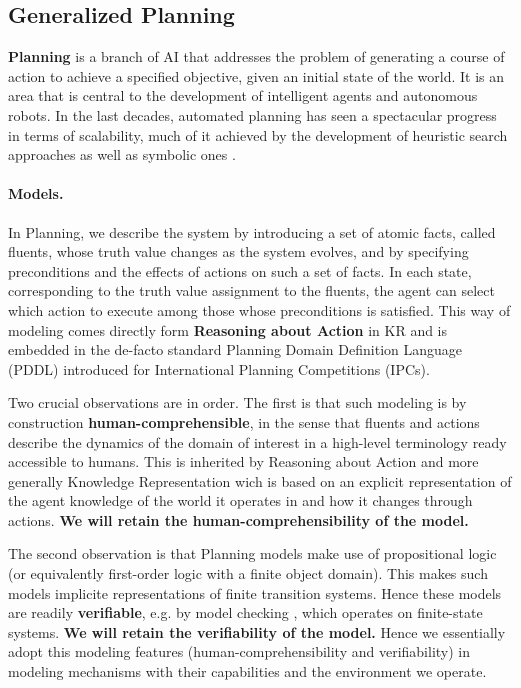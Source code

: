 \subsection{Generalized Planning} \label{subsec:GP}



\textbf{Planning} is a branch of AI that addresses the problem of generating a
course of action to achieve a specified objective, given an initial
state of the world. It is an area that is central to the development
of intelligent agents and autonomous robots. In the last decades,
automated planning has seen a spectacular progress in terms of
scalability, much of it achieved by the development of heuristic
search approaches as well as symbolic ones  \cite{GeffnerBo13,GNT2016}.

\paragraph{Models.} In Planning, we describe the system by introducing a set of
atomic facts, called fluents, whose truth value changes as the system
evolves, and by specifying preconditions and the effects of actions on
such a set of facts. In each state, corresponding to the truth value
assignment to the fluents, the agent can select which action to
execute among those whose preconditions is satisfied. This way of
modeling comes directly form \textbf{Reasoning about Action} in KR
\cite{Reiter01} and is embedded in the de-facto standard Planning
Domain Definition Language (PDDL) \cite{mcdermott:pddl,gerevini:pddl}
introduced for International Planning Competitions (IPCs).

Two crucial observations are in order. The first is that such modeling
is by construction \textbf{human-comprehensible}, in the sense that
fluents and actions describe the dynamics of the domain of interest in
a high-level terminology ready accessible to humans. This is inherited
by Reasoning about Action and more generally Knowledge Representation
wich is based on an explicit representation of the agent knowledge of
the world it operates in and how it changes through
actions. \textbf{We will retain the human-comprehensibility of the model.}

The second observation is that Planning models make use of
propositional logic (or equivalently first-order logic with a finite
object domain). This makes such models implicite representations of
finite transition systems. Hence these models are readily
\textbf{verifiable}, e.g. by model checking
\cite{ClarkeGP:99-ModelChecking,BaKG08,LomuscioQR17}, which operates
on finite-state systems. \textbf{We will retain the
  verifiability of the model.}
Hence we essentially adopt this modeling features (human-comprehensibility and verifiability) in modeling \project  mechanisms with their
capabilities and the environment we operate. 


